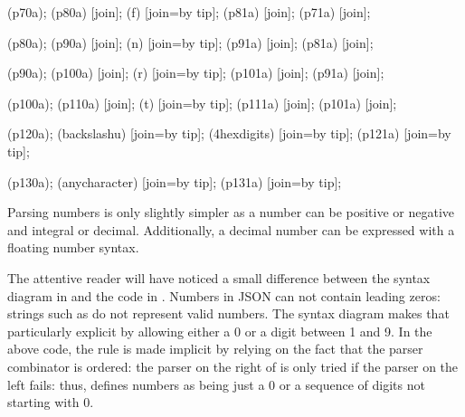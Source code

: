 \documentclass[a4paper,10pt,twoside]{book}
\begin{document}
{{    \chainin (p70a);
    \chainin (p80a) [join];
    \chainin (f) [join=by tip];
    \chainin (p81a) [join];
    \chainin (p71a) [join];

    \chainin (p80a);
    \chainin (p90a) [join];
    \chainin (n) [join=by tip];
    \chainin (p91a) [join];
    \chainin (p81a) [join];

    \chainin (p90a);
    \chainin (p100a) [join];
    \chainin (r) [join=by tip];
    \chainin (p101a) [join];
    \chainin (p91a) [join];

    \chainin (p100a);
    \chainin (p110a) [join];
    \chainin (t) [join=by tip];
    \chainin (p111a) [join];
    \chainin (p101a) [join];

    \chainin (p120a);
    \chainin (backslashu) [join=by tip];
    \chainin (4hexdigits) [join=by tip];
    \chainin (p121a) [join=by tip];

    \chainin (p130a);
    \chainin (anycharacter) [join=by tip];
    \chainin (p131a) [join=by tip];
  }
}

Parsing numbers is only slightly simpler as a number can be positive
or negative and integral or decimal. Additionally, a decimal number
can be expressed with a floating number syntax.


The attentive reader will have noticed a small difference between the
syntax diagram in  and the code in
. Numbers in JSON can not contain leading zeros:
\ie{} strings such as  do not represent valid numbers. The
syntax diagram makes that particularly explicit by allowing either a 0
or a digit between 1 and 9. In the above code, the rule is made
implicit by relying on the fact that the parser combinator \ct{$/} is
ordered: the parser on the right of \ct{$/} is only tried if the
parser on the left fails: thus, 
defines numbers as being just a 0 or a sequence of digits not
starting with 0.

\end{document}
